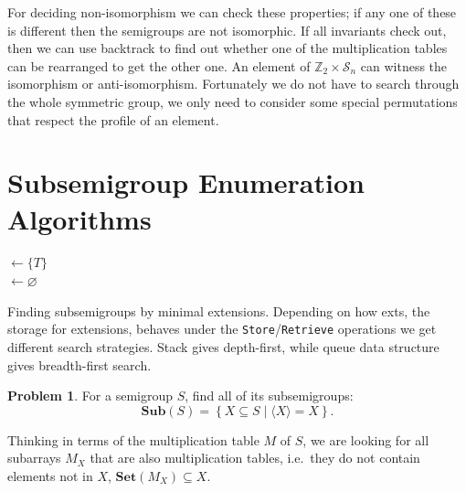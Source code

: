 \documentclass{amsart}
\newcommand{\cS}{{\mathcal S}}
\newcommand{\Sub}{\mathbf{Sub}}
\newcommand{\Set}{\mathbf{Set}}
\newcommand{\Z}{\mathbb{Z}}
\theoremstyle{plain}
\theoremstyle{definition}
\newtheorem{problem}[theorem]{Problem}
\begin{document}
For deciding non-isomorphism we can check these properties; if any one of these is different then the semigroups are not isomorphic.
If all invariants check out, then we can use backtrack to find out whether one of the multiplication tables can be rearranged to get the other one.
An element of $\Z_2\times \cS_n$ can witness the isomorphism or anti-isomorphism.
Fortunately we do not have to search through the whole symmetric group, we only need to consider some special permutations that respect the profile of an element.

\section{Subsemigroup Enumeration Algorithms}
\label{sec:enum}
\begin{algorithm}[t]
\BlankLine
\Name{}
\subs $\leftarrow \{T\}$\\
\exts $\leftarrow \varnothing$\\
\Return \subs
\caption{Finding subsemigroups by minimal extensions. Depending on how \textsf{exts}, the storage for extensions, behaves under the \texttt{Store}/\texttt{Retrieve} operations we get different search strategies. Stack gives depth-first, while queue data structure gives breadth-first search.}
\label{alg:minclosure}
\end{algorithm}

\begin{problem}
For a semigroup $S$, find all of its subsemigroups:
$$\Sub(S)=\left\{ X\subseteq S\mid \langle X\rangle=X\right\}.$$
\end{problem}
Thinking in terms of the multiplication table $M$ of $S$, we are looking for all subarrays $M_X$ that are also multiplication tables, i.e.\ they do not contain elements not in $X$, $\Set(M_X)\subseteq X$.
\end{document}
